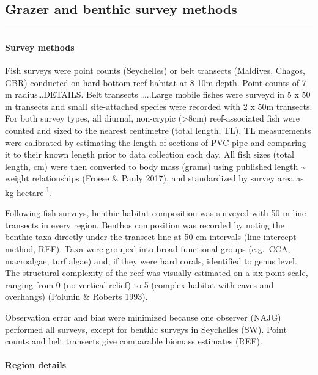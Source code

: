 \documentclass[]{article}
\title{}
\author{}
\date{}
\let\oldparagraph\paragraph
\renewcommand{\paragraph}[1]{\oldparagraph{#1}\mbox{}}
\begin{document}
\subsection{Grazer and benthic survey
methods}\label{grazer-and-benthic-survey-methods}

\begin{center}\rule{0.5\linewidth}{\linethickness}\end{center}

\paragraph{Survey methods}\label{survey-methods}

Fish surveys were point counts (Seychelles) or belt transects (Maldives,
Chagos, GBR) conducted on hard-bottom reef habitat at 8-10m depth. Point
counts of 7 m radius\ldots{}DETAILS. Belt transects \ldots{}..Large
mobile fishes were surveyd in 5 x 50 m transects and small site-attached
species were recorded with 2 x 50m transects. For both survey types, all
diurnal, non-crypic (\textgreater{}8cm) reef-associated fish were
counted and sized to the nearest centimetre (total length, TL). TL
measurements were calibrated by estimating the length of sections of PVC
pipe and comparing it to their known length prior to data collection
each day. All fish sizes (total length, cm) were then converted to body
mass (grams) using published length \textasciitilde{} weight
relationships (Froese \& Pauly 2017), and standardized by survey area as
kg hectare\textsuperscript{-1}.

Following fish surveys, benthic habitat composition was surveyed with 50
m line transects in every region. Benthos composition was recorded by
noting the benthic taxa directly under the transect line at 50 cm
intervals (line intercept method, REF). Taxa were grouped into broad
functional groups (e.g.~CCA, macroalgae, turf algae) and, if they were
hard corals, identified to genus level. The structural complexity of the
reef was visually estimated on a six-point scale, ranging from 0 (no
vertical relief) to 5 (complex habitat with caves and overhangs)
(Polunin \& Roberts 1993).

Observation error and bias were minimized because one observer (NAJG)
performed all surveys, except for benthic surveys in Seychelles (SW).
Point counts and belt transects give comparable biomass estimates (REF).

\paragraph{Region details}\label{region-details}
\end{document}
